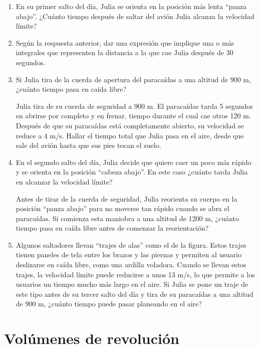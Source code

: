 \documentclass[
  a4paper,
]{scrreport}
\begin{document}
\begin{enumerate}
\def\labelenumi{\arabic{enumi}.}
\item
  En su primer salto del día, Julia se orienta en la posición más lenta
  ``panza abajo''. ¿Cuánto tiempo después de saltar del avión Julia
  alcanza la velocidad límite?
\item
  Según la respuesta anterior, dar una expresión que implique una o más
  integrales que representen la distancia a la que cae Julia después de
  30 segundos.
\item
  Si Julia tira de la cuerda de apertura del paracaídas a una altitud de
  900 m, ¿cuánto tiempo pasa en caída libre?

  Julia tira de su cuerda de seguridad a 900 m. El paracaídas tarda 5
  segundos en abrirse por completo y en frenar, tiempo durante el cual
  cae otros 120 m. Después de que su paracaídas está completamente
  abierto, su velocidad se reduce a 4 m/s. Hallar el tiempo total que
  Julia pasa en el aire, desde que sale del avión hasta que sus pies
  tocan el suelo.
\item
  En el segundo salto del día, Julia decide que quiere caer un poco más
  rápido y se orienta en la posición ``cabeza abajo''. En este caso
  ¿cuánto tarda Julia en alcanzar la velocidad límite?

  Antes de tirar de la cuerda de seguridad, Julia reorienta su cuerpo en
  la posición ``panza abajo'' para no moverse tan rápido cuando se abra
  el paracaídas. Si comienza esta maniobra a una altitud de 1200 m,
  ¿cuánto tiempo pasa en caída libre antes de comenzar la reorientación?
\item
  Algunos saltadores llevan ``trajes de alas'' como el de la figura.
  Estos trajes tienen paneles de tela entre los brazos y las piernas y
  permiten al usuario deslizarse en caída libre, como una ardilla
  voladora. Cuando se llevan estos trajes, la velocidad límite puede
  reducirse a unos 13 m/s, lo que permite a los usuarios un tiempo mucho
  más largo en el aire. Si Julia se pone un traje de este tipo antes de
  su tercer salto del día y tira de su paracaídas a una altitud de 900
  m, ¿cuánto tiempo puede pasar planeando en el aire?
\end{enumerate}


\chapter{Volúmenes de revolución}\label{voluxfamenes-de-revoluciuxf3n}
\end{document}
